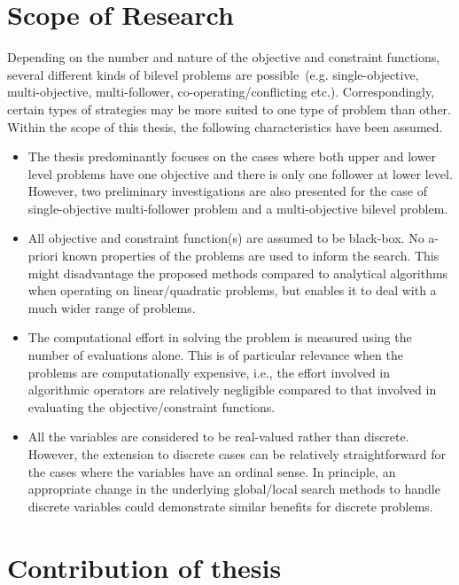 \section{Scope of Research}

Depending on the number and nature of the objective and constraint functions, several different kinds of bilevel problems are possible~(e.g. single-objective, multi-objective, multi-follower, co-operating/conflicting etc.). Correspondingly, certain types of strategies may be more suited to one type of problem than other. Within the scope of this thesis, the following characteristics have been assumed.   

\begin{itemize}
\item The thesis predominantly focuses on the cases where both upper and lower level problems have one objective and there is only one follower at lower level. However, two preliminary investigations are also presented for the case of single-objective multi-follower problem and a multi-objective bilevel problem. 
\item All objective and constraint function(s) are assumed to be black-box. No a-priori known properties of the problems are used to inform the search. This might disadvantage the proposed methods compared to analytical algorithms when operating on linear/quadratic problems, but enables it to deal with a much wider range of problems.  

\item The computational effort in solving the problem is measured using the number of evaluations alone. This is of particular relevance when the problems are computationally expensive, i.e., the effort involved in algorithmic operators are relatively negligible compared to that involved in evaluating the objective/constraint functions. 

\item All the variables are considered to be real-valued rather than discrete. However, the extension to discrete cases can be relatively straightforward for the cases where the variables have an ordinal sense. In principle, an appropriate change in the underlying global/local search methods to handle discrete variables could demonstrate similar benefits for discrete problems. 
\end{itemize}


\section{Contribution of thesis}

